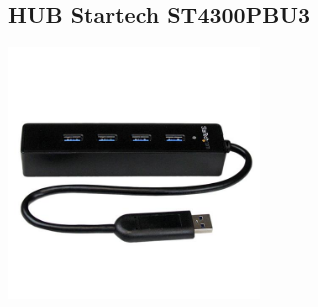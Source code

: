 \documentclass[a4paper]{book}
\begin{document}
\subsection{HUB Startech ST4300PBU3}


\begin{center}
\includegraphics[width=0.5\textwidth]{Figures/Hardware/Partes/ST4300PBU3.jpg}
\label{fig:Hardware:Partes:HUBST}
\end{center}
\end{document}
